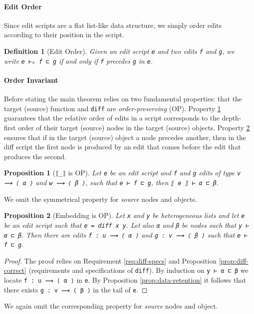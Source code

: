 \documentclass[preprint]{sigplanconf}
\theoremstyle{plain}
\newtheorem{definition}{Definition}
\newtheorem{prop}{Proposition}
\begin{document}
    \paragraph{Edit Order}
    Since edit scripts are a flat list-like data structure, we simply
    order edits according to their position in the script.

\begin{definition}[Edit Order]
Given an edit script \texttt{e} and two edits \texttt{f} and \texttt{g}, we write
\texttt{e ⊢ₑ f ⊏ g} if and only if \texttt{f} precedes \texttt{g} in \texttt{e}.
\end{definition}

\paragraph{Order Invariant}
Before stating the main theorem relies on two fundamental properties:
that the target (source) function and \texttt{diff} are
\emph{order-preserving} (OP).
%
Property \ref{prop:order-preserving-target-fun} guarantees that the
relative order of edits in a script corresponds to the depth-first
order of their target (source) nodes in the target (source) objects.
%
Property \ref{prop:order-preserving-embedding} ensures that if in the
target (source) object a node precedes another, then in the diff
script the first node is produced by an edit that comes before the
edit that produces the second.

\begin{prop}[\texttt{⟦\_⟧} is OP]
\label{prop:order-preserving-target-fun}
Let \texttt{e} be an edit script and \texttt{f} and \texttt{g} edits
of type \texttt{v ⟿ ⟨ α ⟩} and \texttt{w ⟿ ⟨ β ⟩}, such that
\texttt{e ⊢ f ⊏ g}, then \texttt{⟦ e ⟧ ⊢ α ⊏ β}.
\end{prop}
  We omit the symmetrical property for \emph{source} nodes and objects.

\begin{prop}[Embedding is OP]
\label{prop:order-preserving-embedding}
Let \texttt{x} and \texttt{y} be heterogeneous lists and let 
\texttt{e} be an edit script such that \texttt{e = diff x y}.
Let also \texttt{α} and \texttt{β} be nodes such that \texttt{y ⊢ α ⊏ β}.
Then there are edits \texttt{f : u ⟿ ⟨ α ⟩} and \texttt{g : v ⟿ ⟨ β ⟩}
such that \texttt{e ⊢ f ⊏ g}.
\end{prop}
\begin{proof}
  The proof relies on Requirement \ref{req:diff-specs} and Proposition
  \ref{prop:diff-correct} (requirements and specifications of
  \texttt{diff}).
  By induction on \texttt{y ⊢ α ⊏ β} we locate \texttt{f : u ⟿ ⟨ α ⟩}
  in \texttt{e}. 
  By Proposition \ref{prop:data-retention} it follows that there
  exists \texttt{g : v ⟿ ⟨ β ⟩} in the tail of \texttt{e}.
\end{proof}
We again omit the corresponding property for \emph{source} nodes and object.
\end{document}
